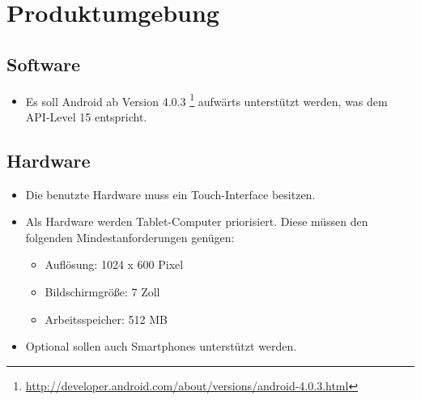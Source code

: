 \section{Produktumgebung}

\subsection{Software}
\begin{itemize}
	\item Es soll Android ab Version 4.0.3 \footnote{\url{http://developer.android.com/about/versions/android-4.0.3.html}} aufwärts unterstützt werden, was dem API-Level 15 entspricht.
\end{itemize}
\subsection{Hardware}
\begin{itemize}
	\item Die benutzte Hardware muss ein Touch-Interface besitzen.
	\item Als Hardware werden Tablet-Computer priorisiert. Diese müssen den folgenden Mindestanforderungen genügen:
	\begin{itemize}
		\item Auflösung: 1024 x 600 Pixel
		\item Bildschirmgröße: 7 Zoll
		\item Arbeitsspeicher: 512 MB
	\end{itemize}
	\item Optional sollen auch Smartphones unterstützt werden.
\end{itemize}
